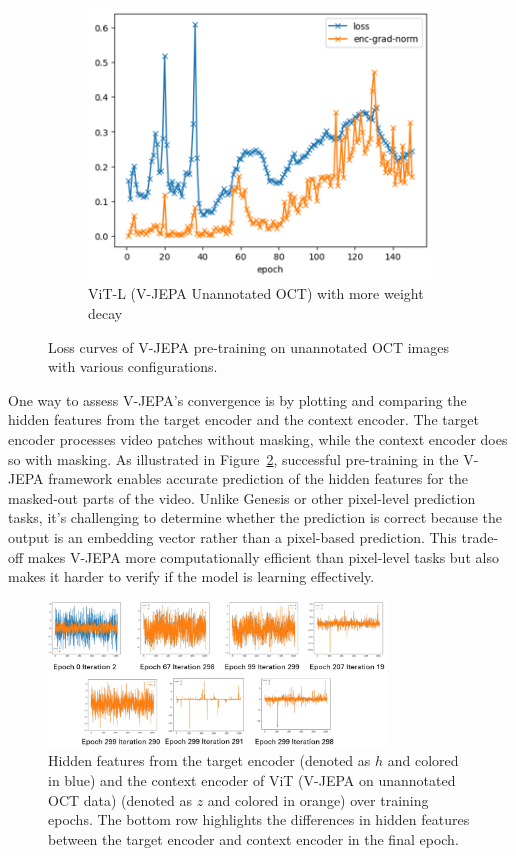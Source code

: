 \documentclass[a4paper,11pt,oneside]{report}
\begin{document}
\begin{figure}[hbt]
\begin{subfigure}[t]{0.3\textwidth}
        \includegraphics[width=0.9\linewidth]{figures/discussion_vjepa_training_3.png}
        \caption{ViT-L (V-JEPA Unannotated OCT) with more weight decay}
    \end{subfigure}
    \caption{Loss curves of V-JEPA pre-training on unannotated OCT images with various configurations.}
    \label{fig:v-jepa-training}
\end{figure}

One way to assess V-JEPA's convergence is by plotting and comparing the hidden features from the target encoder and the context encoder. The target encoder processes video patches without masking, while the context encoder does so with masking. As illustrated in Figure~\ref{fig:v-jepa-prediction}, successful pre-training in the V-JEPA framework enables accurate prediction of the hidden features for the masked-out parts of the video. Unlike Genesis or other pixel-level prediction tasks, it's challenging to determine whether the prediction is correct because the output is an embedding vector rather than a pixel-based prediction. This trade-off makes V-JEPA more computationally efficient than pixel-level tasks but also makes it harder to verify if the model is learning effectively.

\begin{figure}[hbt]
    \centering
    \includegraphics[width=0.8\textwidth]{figures/discussion_vjepa_prediction.png}
    \caption{Hidden features from the target encoder (denoted as \(h\) and colored in blue) and the context encoder of ViT (V-JEPA on unannotated OCT data) (denoted as \(z\) and colored in orange) over training epochs. The bottom row highlights the differences in hidden features between the target encoder and context encoder in the final epoch.}
    \label{fig:v-jepa-prediction}
\end{figure}
\end{document}
